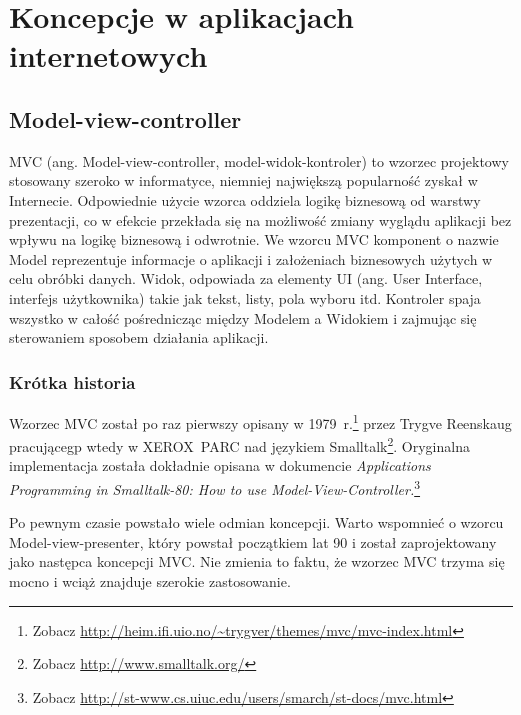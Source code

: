 \documentclass[a4paper,12pt,oneside]{report}
\begin{document}
\chapter{Koncepcje w aplikacjach internetowych}
\label{cha:koncepcje}

\section{Model-view-controller}
\label{sec:mvc}
MVC (ang. Model-view-controller, model-widok-kontroler) to wzorzec projektowy stosowany szeroko w informatyce, niemniej największą popularność zyskał w Internecie. Odpowiednie użycie wzorca oddziela logikę biznesową od warstwy prezentacji, co w efekcie przekłada się na możliwość zmiany wyglądu aplikacji bez wpływu na logikę biznesową i odwrotnie. We wzorcu MVC komponent o nazwie Model reprezentuje informacje o aplikacji i założeniach biznesowych użytych w celu obróbki danych. Widok, odpowiada za elementy UI (ang. User Interface, interfejs użytkownika) takie jak tekst, listy, pola wyboru itd. Kontroler spaja wszystko w całość pośrednicząc między Modelem a Widokiem i zajmując się sterowaniem sposobem działania aplikacji.

\subsection{Krótka historia}
\label{subsec:mvc-historia}
Wzorzec MVC został po raz pierwszy opisany w 1979~r.\footnote{Zobacz \url{http://heim.ifi.uio.no/~trygver/themes/mvc/mvc-index.html}} przez Trygve Reenskaug pracującegp wtedy w XEROX~PARC nad językiem Smalltalk\footnote{Zobacz \url{http://www.smalltalk.org/}}. Oryginalna implementacja została dokładnie opisana w dokumencie \emph{Applications Programming in Smalltalk-80: How to use Model-View-Controller.}\footnote{Zobacz \url{http://st-www.cs.uiuc.edu/users/smarch/st-docs/mvc.html}}

Po pewnym czasie powstało wiele odmian koncepcji. Warto wspomnieć o wzorcu Model-view-presenter, który powstał początkiem lat 90 i został zaprojektowany jako następca koncepcji MVC. Nie zmienia to faktu, że wzorzec MVC trzyma się mocno i wciąż znajduje szerokie zastosowanie.
\end{document}
